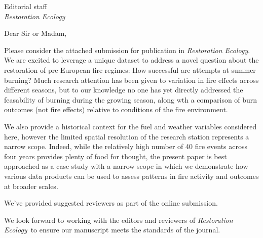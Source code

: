 \documentclass[parskip=half, 
			   fontsize=12pt,
			   paper=a4]				
{scrartcl}
\newcommand{\journal}{\emph{Restoration Ecology}}
\begin{document}
	\begin{letter}{Editorial staff\\
		\journal }
\setlength{\parindent}{12pt}

\opening{Dear Sir or Madam,}  
		
Please consider the attached submission for publication in \journal. 
We are excited to leverage a unique dataset to address a novel question about the restoration of pre-European fire regimes: How successful are attempts at summer burning?
Much research attention has been given to variation in fire effects across different seasons, but to our knowledge no one has yet directly addressed the feasability of burning during the growing season, along wth a comparison of burn outcomes (not fire effects) relative to conditions of the fire environment. 

We also provide a historical context for the fuel and weather variables considered here, however the limited spatial resolution of the research station represents a narrow scope. 
Indeed, while the relatively high number of 40 fire events across four years provides plenty of food for thought, the present paper is best approached as a case study with a narrow scope in which we demonstrate how various data products can be used to assess patterns in fire activity and outcomes at broader scales.  

We've provided suggested reviewers as part of the online submission. 

We look forward to working with the editors and reviewers of \journal~to ensure our manuscript meets the standards of the journal. 

\vspace{-3em} 
\closing{} %
\end{letter}
\end{document}
